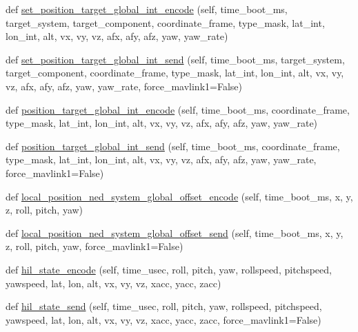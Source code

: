 \begin{DoxyCompactItemize}
\item 
def \hyperlink{classpymavlink_1_1dialects_1_1v10_1_1MAVLink_ad123ba8e1950564101d409079d4a86eb}{set\+\_\+position\+\_\+target\+\_\+global\+\_\+int\+\_\+encode} (self, time\+\_\+boot\+\_\+ms, target\+\_\+system, target\+\_\+component, coordinate\+\_\+frame, type\+\_\+mask, lat\+\_\+int, lon\+\_\+int, alt, vx, vy, vz, afx, afy, afz, yaw, yaw\+\_\+rate)
\item 
def \hyperlink{classpymavlink_1_1dialects_1_1v10_1_1MAVLink_ab83c248e31d51f99fef1c801581d5b36}{set\+\_\+position\+\_\+target\+\_\+global\+\_\+int\+\_\+send} (self, time\+\_\+boot\+\_\+ms, target\+\_\+system, target\+\_\+component, coordinate\+\_\+frame, type\+\_\+mask, lat\+\_\+int, lon\+\_\+int, alt, vx, vy, vz, afx, afy, afz, yaw, yaw\+\_\+rate, force\+\_\+mavlink1=False)
\item 
def \hyperlink{classpymavlink_1_1dialects_1_1v10_1_1MAVLink_ae968d9a925712082d26345007ac36735}{position\+\_\+target\+\_\+global\+\_\+int\+\_\+encode} (self, time\+\_\+boot\+\_\+ms, coordinate\+\_\+frame, type\+\_\+mask, lat\+\_\+int, lon\+\_\+int, alt, vx, vy, vz, afx, afy, afz, yaw, yaw\+\_\+rate)
\item 
def \hyperlink{classpymavlink_1_1dialects_1_1v10_1_1MAVLink_a1f8c63e991094848c433446005db0671}{position\+\_\+target\+\_\+global\+\_\+int\+\_\+send} (self, time\+\_\+boot\+\_\+ms, coordinate\+\_\+frame, type\+\_\+mask, lat\+\_\+int, lon\+\_\+int, alt, vx, vy, vz, afx, afy, afz, yaw, yaw\+\_\+rate, force\+\_\+mavlink1=False)
\item 
def \hyperlink{classpymavlink_1_1dialects_1_1v10_1_1MAVLink_adb2f5012c91d6329242c439fd4ae6d83}{local\+\_\+position\+\_\+ned\+\_\+system\+\_\+global\+\_\+offset\+\_\+encode} (self, time\+\_\+boot\+\_\+ms, x, y, z, roll, pitch, yaw)
\item 
def \hyperlink{classpymavlink_1_1dialects_1_1v10_1_1MAVLink_af8fae86f58dcb82e1e7908ad6db867e9}{local\+\_\+position\+\_\+ned\+\_\+system\+\_\+global\+\_\+offset\+\_\+send} (self, time\+\_\+boot\+\_\+ms, x, y, z, roll, pitch, yaw, force\+\_\+mavlink1=False)
\item 
def \hyperlink{classpymavlink_1_1dialects_1_1v10_1_1MAVLink_a0b1430ba2281ae900c90c019bce3d4b2}{hil\+\_\+state\+\_\+encode} (self, time\+\_\+usec, roll, pitch, yaw, rollspeed, pitchspeed, yawspeed, lat, lon, alt, vx, vy, vz, xacc, yacc, zacc)
\item 
def \hyperlink{classpymavlink_1_1dialects_1_1v10_1_1MAVLink_a90b361b95b8c4c5f238753a33e108d88}{hil\+\_\+state\+\_\+send} (self, time\+\_\+usec, roll, pitch, yaw, rollspeed, pitchspeed, yawspeed, lat, lon, alt, vx, vy, vz, xacc, yacc, zacc, force\+\_\+mavlink1=False)

\end{DoxyCompactItemize}
